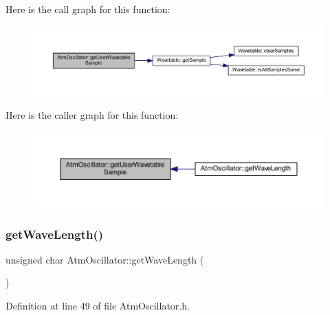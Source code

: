 Here is the call graph for this function\+:
\nopagebreak
\begin{figure}[H]
\begin{center}
\leavevmode
\includegraphics[width=350pt]{class_atm_oscillator_ae5ef1556ef77dbf9ecceb5b64a1ad7e8_cgraph}
\end{center}
\end{figure}
Here is the caller graph for this function\+:
\nopagebreak
\begin{figure}[H]
\begin{center}
\leavevmode
\includegraphics[width=350pt]{class_atm_oscillator_ae5ef1556ef77dbf9ecceb5b64a1ad7e8_icgraph}
\end{center}
\end{figure}
\mbox{\label{class_atm_oscillator_ad846116dfd6f232cae79ada35dddadfd}} 
\subsubsection{\texorpdfstring{get\+Wave\+Length()}{getWaveLength()}}
{\footnotesize\ttfamily unsigned char Atm\+Oscillator\+::get\+Wave\+Length (\begin{DoxyParamCaption}{ }\end{DoxyParamCaption})\hspace{0.3cm}{\ttfamily [inline]}}



Definition at line 49 of file Atm\+Oscillator.\+h.


